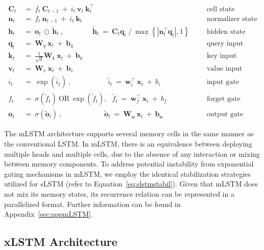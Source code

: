 \begin{align}
\label{eq:mlstm_recurrent_begin}
\mathbf{C}_t \ &= \  f_t \ \mathbf{C}_{t-1} \ + \ 
  i_t \ \mathbf{v}_t \ \mathbf{k}_t^\top & &  &\text{cell state} \\
\mathbf{n}_t \ &= \  f_t \ \mathbf{n}_{t-1} \ + \ 
  i_t \ \mathbf{k}_t & &  &\text{normalizer state} \\
\mathbf{h}_t  \ &= \ \mathbf{o}_t \ \odot \ \tilde{\mathbf{h}}_t
\ , \qquad \qquad 
\tilde{\mathbf{h}}_t \ = \   \mathbf{C}_t \mathbf{q}_t \ / \ 
  \max \left\{ |\mathbf{n}_t^\top \mathbf{q}_t|, 1 \right\} 
   &&&\text{hidden state} \\
\mathbf{q}_t \ &= \ \mathbf{W}_q \ \mathbf{x}_t \ + \ \mathbf{b}_q  & &  &\text{query input} \\
\mathbf{k}_t \ &= \ \frac{1}{\sqrt{d}} \mathbf{W}_k \ \mathbf{x}_t \ + \ \mathbf{b}_k  & &  &\text{key input} \\
\mathbf{v}_t \ &= \ \mathbf{W}_v \ \mathbf{x}_t \ + \ \mathbf{b}_v  & &  &\text{value input} \\
i_t \ &= \ \!\exp \!  \! \left( \tilde{i}_t  \right) \ , 
 \qquad \qquad \ \ \ \ \,
  \tilde{i}_t \ = \ \mathbf{w}^\top_{i} \ \mathbf{x}_t \ + \  b_{i} \ \ \ 
  &&&\text{input gate} \\
f_t \ &= \ \sigma \!  \left(  \tilde{f}_t \right) \ \text{OR} \ \!\exp \!  \! \left(  \tilde{f}_t \right) , \ \ \: \!
\tilde{f}_t \ = \ \mathbf{w}^\top_{f} \ \mathbf{x}_t  \ + \
  b_{f}
  &&& \text{forget gate} \\
\label{eq:mlstm_recurrent_end}
\mathbf{o}_t \ &= \ \sigma \left( \tilde{\mathbf{o}}_t \right) \ , \qquad \qquad \quad \ \ \ \,
  \tilde{\mathbf{o}}_t  \ = \ \mathbf{W}_{\mathbf{o}} \ \mathbf{x}_t \ + \
  \mathbf{b}_{\mathbf{o}}
  &&&\text{output gate} 
\end{align}

The mLSTM architecture supports several memory cells in the same manner as the conventional LSTM. In mLSTM, there is an equivalence between deploying multiple heads and multiple cells, due to the absence of any interaction or mixing between memory components. To address potential instability from exponential gating mechanisms in mLSTM, we employ the identical stabilization strategies utilized for sLSTM (refer to Equation~\ref{eq:slstmstabil}). 
Given that mLSTM does not mix its memory states, its recurrence relation can be represented in a parallelized format. Further information can be found in Appendix~\ref{sec:appmLSTM}.

\subsection{xLSTM Architecture}
\label{sec:xLSTMarch}

